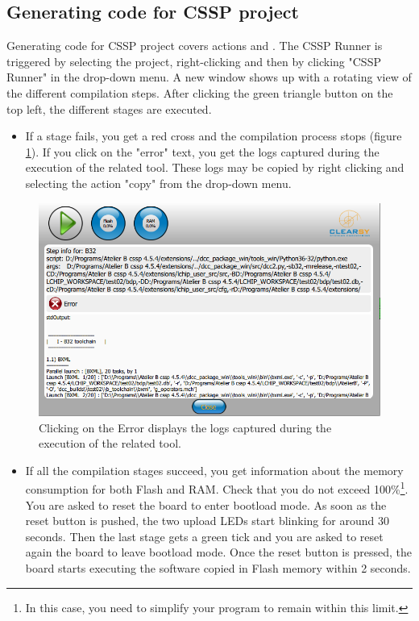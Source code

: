 \subsection{Generating code for CSSP project}

Generating code for CSSP project covers actions  and . The CSSP Runner is triggered by selecting the project, right-clicking and then by clicking "CSSP Runner" in the drop-down menu. A new window shows up with a rotating view of the different compilation steps. After clicking the green triangle button on the top left, the different stages are executed. 
\begin{itemize}
    \item If a stage fails, you get a red cross and the compilation process stops (figure \ref{programming:runner-error}). If you click on the "error" text, you get the logs captured during the execution of the related tool. These logs may be copied by right clicking and selecting the action "copy" from the drop-down menu. 
\end{itemize}    
      \begin{figure}[h]
\centering\includegraphics[scale=0.3]{Pictures/chapterProgramming/runner-error.png}
\caption{Clicking on the Error displays the logs captured during the execution of the related tool.}
\label{programming:runner-error}
\end{figure}  
\begin{itemize}
    \item If all the compilation stages succeed, you get information about the memory consumption for both Flash and RAM. Check that you do not exceed 100\%\footnote{In this case, you need to simplify your program to remain within this limit.}. You are asked to reset the board to enter bootload mode. As soon as the reset button is pushed, the two upload LEDs start blinking for around 30 seconds. Then the last stage gets a green tick and you are asked to reset again the board to leave bootload mode. Once the reset button is pressed, the board starts executing the software copied in Flash memory within 2 seconds.
\end{itemize}
